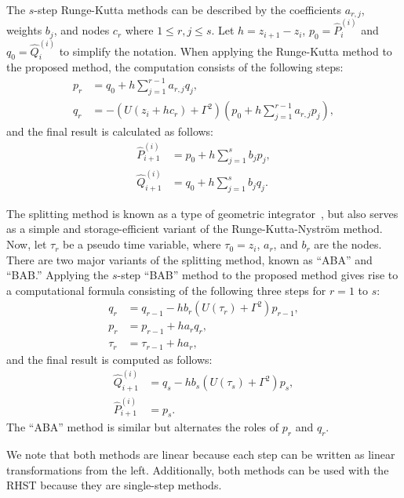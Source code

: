 \documentclass[preprint, 5p, times, sort&compress]{elsarticle}
\begin{document}
        The $s$-step Runge-Kutta methods can be described by the coefficients $a_{r,j}$, weights $b_{j}$, and nodes $c_r$ where $1\le r, j\le s$.
        Let $h=z_{i+1}-z_i$, $p_0=\hat{P}_{i}^{(i)}$ and $q_0=\hat{Q}_{i}^{(i)}$ to simplify the notation.
        When applying the Runge-Kutta method to the proposed method, the computation consists of the following steps:
        \begin{align}
                p_r &= q_0 + h\sum_{j=1}^{r-1}a_{r,j}q_j, \\
                q_r &= -\left(U(z_i+hc_r)+\Gamma^2\right)\left(p_0 + h\sum_{j=1}^{r-1}a_{r,j}p_j\right),
        \end{align}
        and the final result is calculated as follows:
        \begin{align}
                \hat{P}_{i+1}^{(i)} &= p_0 + h\sum_{j=1}^sb_jp_j, \\
                \hat{Q}_{i+1}^{(i)} &= q_0 + h\sum_{j=1}^sb_jq_j.
        \end{align}

        The splitting method is known as a type of geometric integrator~\cite{Blanes2002},
        but also serves as a simple and storage-efficient variant of the Runge-Kutta-Nystr\"{o}m method.
        Now, let $\tau_r$ be a pseudo time variable, where $\tau_0=z_i$, $a_r$, and $b_r$ are the nodes.
        There are two major variants of the splitting method, known as ``ABA'' and ``BAB.''
        Applying the $s$-step ``BAB'' method to the proposed method gives rise to a computational formula consisting of the following three steps for $r=1$ to $s$:
        \begin{align}
                q_r &= q_{r-1} - hb_r\left(U(\tau_r)+\Gamma^2\right)p_{r-1},\\
                p_r &= p_{r-1} + ha_r q_r, \\
                \tau_r &= \tau_{r-1} + ha_r,
        \end{align}
        and the final result is computed as follows:
        \begin{align}
                \hat{Q}_{i+1}^{(i)} &= q_s - hb_s\left(U(\tau_s)+\Gamma^2\right)p_s,\\
                \hat{P}_{i+1}^{(i)} &= p_s.
        \end{align}
        The ``ABA'' method is similar but alternates the roles of $p_r$ and $q_r$.

        We note that both methods are linear because each step can be written as linear transformations from the left.
        Additionally, both methods can be used with the RHST because they are single-step methods.
\end{document}

